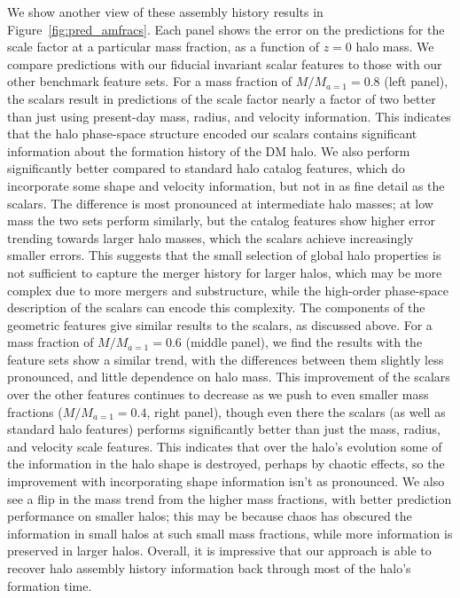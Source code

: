We show another view of these assembly history results in Figure~\ref{fig:pred_amfracs}.
Each panel shows the error on the predictions for the scale factor at a particular mass fraction, as a function of $z=0$ halo mass. 
We compare predictions with our fiducial invariant scalar features to those with our other benchmark feature sets.
For a mass fraction of $M/M_{a=1} = 0.8$ (left panel), the scalars result in predictions of the scale factor nearly a factor of two better than just using present-day mass, radius, and velocity information.
This indicates that the halo phase-space structure encoded our scalars contains significant information about the formation history of the DM halo.
We also perform significantly better compared to standard halo catalog features, which do incorporate some shape and velocity information, but not in as fine detail as the scalars.
The difference is most pronounced at intermediate halo masses; at low mass the two sets perform similarly, but the catalog features show higher error trending towards larger halo masses, which the scalars achieve increasingly smaller errors.
This suggests that the small selection of global halo properties is not sufficient to capture the merger history for larger halos, which may be more complex due to more mergers and substructure, while the high-order phase-space description of the scalars can encode this complexity.
The components of the geometric features give similar results to the scalars, as discussed above.
For a mass fraction of $M/M_{a=1} = 0.6$ (middle panel), we find the results with the feature sets show a similar trend, with the differences between them slightly less pronounced, and little dependence on halo mass.
This improvement of the scalars over the other features continues to decrease as we push to even smaller mass fractions ($M/M_{a=1} = 0.4$, right panel), though even there the scalars (as well as standard halo features) performs significantly better than just the mass, radius, and velocity scale features.
This indicates that over the halo's evolution some of the information in the halo shape is destroyed, perhaps by chaotic effects, so the improvement with incorporating shape information isn't as pronounced. 
We also see a flip in the mass trend from the higher mass fractions, with better prediction performance on smaller halos; this may be because chaos has obscured the information in small halos at such small mass fractions, while more information is preserved in larger halos.
Overall, it is impressive that our approach is able to recover halo assembly history information back through most of the halo's formation time.

